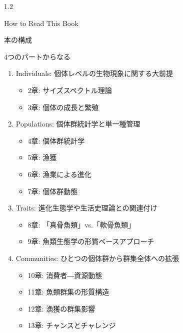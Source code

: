 \documentclass[
  ignorenonframetext,
]{beamer}
\providecommand{\tightlist}{%
  \setlength{\itemsep}{0pt}\setlength{\parskip}{0pt}}
\begin{document}
\begin{frame}

\begin{LARGE} 
\begin{center}
\begin{bf}
1.2   
  
How to Read This Book
\end{bf}
\end{center}
\end{LARGE}

\end{frame}

\begin{frame}{本の構成}
\protect\hypertarget{ux672cux306eux69cbux6210}{}

\begin{block}{4つのパートからなる}

\begin{enumerate}
\tightlist
\item
  Individuals: 個体レベルの生物現象に関する大前提

  \begin{itemize}
  \tightlist
  \item
    2章: サイズスペクトル理論
  \item
    3章: 個体の成長と繁殖\pause
  \end{itemize}
\item
  Populations: 個体群統計学と単一種管理

  \begin{itemize}
  \tightlist
  \item
    4章: 個体群統計学
  \item
    5章: 漁獲
  \item
    6章: 漁業による進化
  \item
    7章: 個体群動態\pause
  \end{itemize}
\item
  Traits: 進化生態学や生活史理論との関連付け

  \begin{itemize}
  \tightlist
  \item
    8章: 「真骨魚類」vs.「軟骨魚類」
  \item
    9章: 魚類生態学の形質ベースアプローチ\pause
  \end{itemize}
\item
  Communities: ひとつの個体群から群集全体への拡張

  \begin{itemize}
  \tightlist
  \item
    10章: 消費者―資源動態
  \item
    11章: 魚類群集の形質構造
  \item
    12章: 漁獲の群集影響
  \item
    13章: チャンスとチャレンジ
  \end{itemize}
\end{enumerate}

\end{block}

\end{frame}
\end{document}

